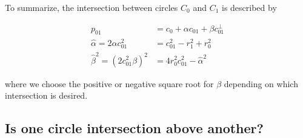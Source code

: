 \documentclass[11pt]{article}
\newcommand{\halpha}{\hat{\alpha}}
\newcommand{\hbeta}{\hat{\beta}}
\begin{document}
To summarize, the intersection between circles $C_0$ and $C_1$ is described by
\begin{linenomath*}
\begin{align*}
p_{01} &= c_0 + \alpha c_{01} + \beta c_{01}^\perp \\
\halpha = 2 \alpha c_{01}^2 &= c_{01}^2 - r_1^2 + r_0^2 \\
\hbeta^2 = (2c_{01}^2 \beta)^2 &= 4 r_0^2 c_{01}^2 - \halpha^2
\end{align*}
\end{linenomath*}
where we choose the positive or negative square root for $\beta$ depending on which intersection is desired.

\subsection{Is one circle intersection above another?}
\end{document}
